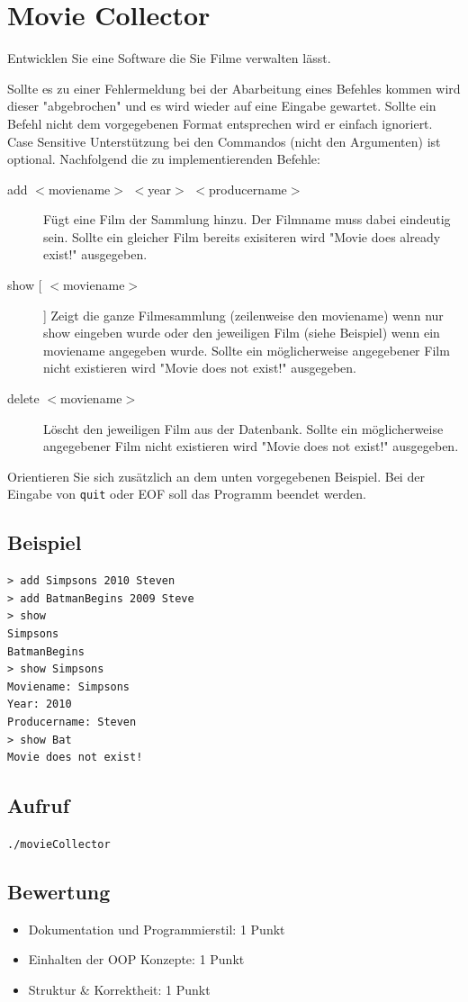 \documentclass[a4paper,10pt]{article}
\begin{document}
\section*{Movie Collector}

Entwicklen Sie eine Software die Sie Filme verwalten lässt.

Sollte es zu einer Fehlermeldung bei der Abarbeitung eines Befehles kommen
wird dieser "abgebrochen" und es wird wieder auf eine Eingabe gewartet.
Sollte ein Befehl nicht dem vorgegebenen Format entsprechen wird er einfach ignoriert. Case Sensitive Unterstützung bei den Commandos (nicht den Argumenten) ist optional.
Nachfolgend die zu implementierenden Befehle:

\begin{description}
 \item[add $<$moviename$>$ $<$year$>$ $<$producername$>$] Fügt eine Film der Sammlung hinzu. Der Filmname muss dabei eindeutig sein.
  Sollte ein gleicher Film bereits exisiteren wird "Movie does already exist!" ausgegeben.
 \item[show $[$ $<$moviename$>$]$ $] Zeigt die ganze Filmesammlung (zeilenweise den moviename) wenn nur show eingeben wurde oder den jeweiligen Film (siehe Beispiel) wenn ein moviename angegeben wurde.
 Sollte ein möglicherweise angegebener Film nicht existieren wird "Movie does not exist!" ausgegeben.
 \item[delete $<$moviename$>$ ] Löscht den jeweiligen Film aus der Datenbank. Sollte ein möglicherweise angegebener Film nicht existieren wird "Movie does not exist!" ausgegeben.
\end{description}

Orientieren Sie sich zusätzlich an dem unten vorgegebenen Beispiel. Bei der Eingabe von \texttt{quit} oder EOF soll das Programm beendet werden.

\subsection*{Beispiel}
\begin{verbatim}
> add Simpsons 2010 Steven
> add BatmanBegins 2009 Steve
> show
Simpsons
BatmanBegins
> show Simpsons
Moviename: Simpsons
Year: 2010
Producername: Steven
> show Bat
Movie does not exist!
\end{verbatim}

\subsection*{Aufruf}
\texttt{./movieCollector}

\subsection*{Bewertung}
\begin{itemize}
 \item Dokumentation und Programmierstil: 1 Punkt
 \item Einhalten der OOP Konzepte: 1 Punkt
 \item Struktur \& Korrektheit: 1 Punkt
\end{itemize}

\newpage
\end{document}
